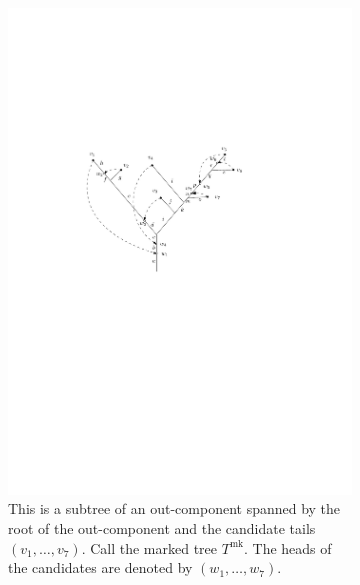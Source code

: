 \begin{figure}
\centering
\begin{subfigure}{.7\textwidth}
 \centering
    \includegraphics[width=0.8\linewidth]{Content/Pictures/out-componentwithcandidates.pdf}
    \caption{This is a subtree of an out-component spanned by the root of the out-component and the candidate tails $(v_1,\dots,v_7)$. Call the marked tree $T^{\mathrm{mk}}$. The heads of the candidates are denoted by $(w_1,\dots,w_7)$. }
\label{figure.extractSCCs1}
\end{subfigure}\\
\vspace{1.5em}
\begin{subfigure}{.8\textwidth}
  \centering

\end{subfigure}
\end{figure}
